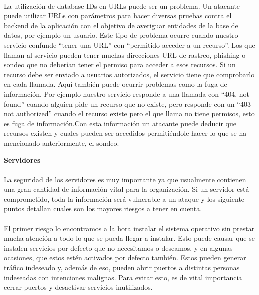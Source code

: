\paragraph{}
La utilización de database IDs en URLs puede ser un problema. Un atacante puede utilizar URLs con parámetros para hacer diversas pruebas contra el backend de la aplicación con el objetivo de averiguar entidades de la base de datos, por ejemplo un usuario. Este tipo de problema ocurre cuando nuestro servicio confunde “tener una URL” con “permitido acceder a un recurso”. Los que llaman al servicio pueden tener muchas direcciones URL de rastreo, phishing o sondeo que no deberían tener el permiso para acceder a esos recursos. Si un recurso debe ser enviado a usuarios autorizados, el servicio tiene que comprobarlo en cada llamada. Aquí también puede ocurrir problemas como la fuga de información. Por ejemplo nuestro servicio responde a una llamada con “404, not found” cuando alguien pide un recurso que no existe, pero responde con un “403 not authorized” cuando el recurso existe pero el que llama no tiene permisos, esto es fuga de información.Con esta información un atacante puede deducir que recursos existen y cuales pueden ser accedidos permitiéndole hacer lo que se ha mencionado anteriormente, el sondeo.

\textbf{Servidores}
\paragraph{}
La seguridad de los servidores es muy importante ya que usualmente contienen una gran cantidad de información vital para la organización. Si un servidor está comprometido, toda la información será vulnerable a un ataque y los siguiente puntos detallan cuales son los mayores riesgos a tener en cuenta.
\paragraph{}
El primer riesgo lo encontramos a la hora instalar el sistema operativo sin prestar mucha atención a todo lo que se pueda llegar a instalar. Esto puede causar que se instalen servicios por defecto que no necesitamos o deseamos, y en algunas ocasiones, que estos estén activados por defecto también. Estos pueden generar tráfico indeseado y, además de eso, pueden abrir puertos a distintas personas indeseadas con intenciones malignas. Para evitar esto, es de vital importancia cerrar puertos y desactivar servicios inutilizados.
